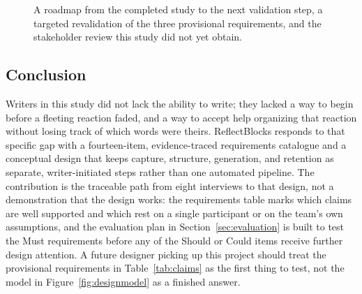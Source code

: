 \documentclass[sigconf,nonacm]{acmart}
\begin{document}
\begin{figure}[tb]
  \centering
  \caption{A roadmap from the completed study to the next validation step, a
  targeted revalidation of the three provisional requirements, and the
  stakeholder review this study did not yet obtain.}
  \label{fig:roadmap}
\end{figure}

\subsection{Conclusion}

Writers in this study did not lack the ability to write; they lacked a way
to begin before a fleeting reaction faded, and a way to accept help
organizing that reaction without losing track of which words were theirs.
ReflectBlocks responds to that specific gap with a fourteen-item,
evidence-traced requirements catalogue and a conceptual design that keeps
capture, structure, generation, and retention as separate, writer-initiated
steps rather than one automated pipeline. The contribution is the traceable
path from eight interviews to that design, not a demonstration that the
design works: the requirements table marks which claims are well supported
and which rest on a single participant or on the team's own assumptions,
and the evaluation plan in Section~\ref{sec:evaluation} is built to test
the Must requirements before any of the Should or Could items receive
further design attention. A future designer picking up this project should
treat the provisional requirements in Table~\ref{tab:claims} as the first
thing to test, not the model in Figure~\ref{fig:designmodel} as a finished
answer.
\end{document}
